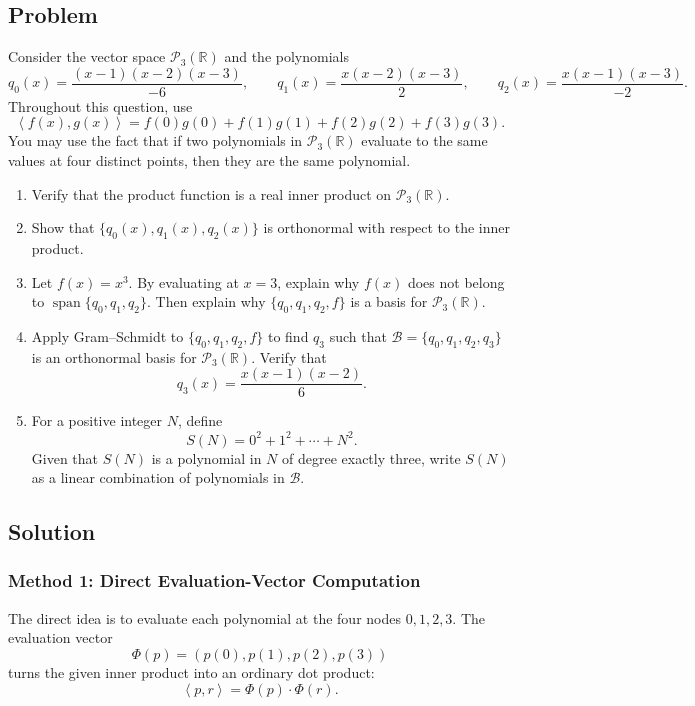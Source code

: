\documentclass[12pt]{article}
\newcommand{\R}{\mathbb{R}}
\newcommand{\B}{\mathcal{B}}
\newcommand{\Ppoly}{\mathcal{P}}
\newcommand{\Span}{\operatorname{span}}
\newcommand{\ip}[2]{\left\langle #1,#2\right\rangle}
\begin{document}
\subsection{Problem}
Consider the vector space $\Ppoly_3(\R)$ and the polynomials
\[
q_0(x)=\frac{(x-1)(x-2)(x-3)}{-6},
\qquad
q_1(x)=\frac{x(x-2)(x-3)}{2},
\qquad
q_2(x)=\frac{x(x-1)(x-3)}{-2}.
\]
Throughout this question, use
\[
\ip{f(x)}{g(x)}=f(0)g(0)+f(1)g(1)+f(2)g(2)+f(3)g(3).
\]
You may use the fact that if two polynomials in $\Ppoly_3(\R)$ evaluate to the same values at four distinct points, then they are the same polynomial.
\begin{enumerate}[label=(\alph*)]
  \item Verify that the product function is a real inner product on $\Ppoly_3(\R)$.
  \item Show that $\{q_0(x),q_1(x),q_2(x)\}$ is orthonormal with respect to the inner product.
  \item Let $f(x)=x^3$. By evaluating at $x=3$, explain why $f(x)$ does not belong to $\Span\{q_0,q_1,q_2\}$. Then explain why $\{q_0,q_1,q_2,f\}$ is a basis for $\Ppoly_3(\R)$.
  \item Apply Gram--Schmidt to $\{q_0,q_1,q_2,f\}$ to find $q_3$ such that $\B=\{q_0,q_1,q_2,q_3\}$ is an orthonormal basis for $\Ppoly_3(\R)$. Verify that
  \[
  q_3(x)=\frac{x(x-1)(x-2)}6.
  \]
  \item For a positive integer $N$, define
  \[
  S(N)=0^2+1^2+\cdots+N^2.
  \]
  Given that $S(N)$ is a polynomial in $N$ of degree exactly three, write $S(N)$ as a linear combination of polynomials in $\B$.
\end{enumerate}

\newpage
\subsection{Solution}

\subsubsection{Method 1: Direct Evaluation-Vector Computation}
The direct idea is to evaluate each polynomial at the four nodes $0,1,2,3$. The evaluation vector
\[
\Phi(p)=(p(0),p(1),p(2),p(3))
\]
turns the given inner product into an ordinary dot product:
\[
\ip{p}{r}=\Phi(p)\cdot\Phi(r).
\]
\end{document}
